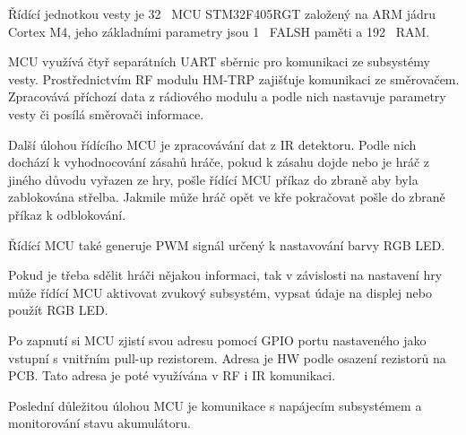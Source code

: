 Řídící jednotkou vesty je 32~ MCU STM32F405RGT založený na ARM jádru Cortex M4, jeho základními parametry jsou 1~ FALSH paměti a 192~ RAM.

MCU využívá čtyř separátních UART sběrnic pro komunikaci ze subsystémy vesty. Prostřednictvím RF modulu HM-TRP zajišťuje komunikaci ze směrovačem. Zpracovává příchozí data z rádiového modulu a podle nich nastavuje parametry vesty či posílá směrovači informace.

Další úlohou řídícího MCU je zpracovávání dat z IR detektoru. Podle nich dochází k vyhodnocování zásahů hráče, pokud k zásahu dojde nebo je hráč z jiného důvodu vyřazen ze hry, pošle řídící MCU příkaz do zbraně aby byla zablokována střelba. Jakmile může hráč opět ve kře pokračovat pošle do zbraně příkaz k odblokování.

Řídící MCU také generuje PWM signál určený k nastavování barvy RGB LED.

Pokud je třeba sdělit hráči nějakou informaci, tak v závislosti na nastavení hry může řídící MCU aktivovat zvukový subsystém, vypsat údaje na displej nebo použít RGB LED.

Po zapnutí si MCU zjistí svou adresu pomocí GPIO portu nastaveného jako vstupní s vnitřním pull-up rezistorem. Adresa je HW podle osazení rezistorů na PCB. Tato adresa je poté využívána v RF i IR komunikaci.

Poslední důležitou úlohou MCU je komunikace s napájecím subsystémem a monitorování stavu akumulátoru.


